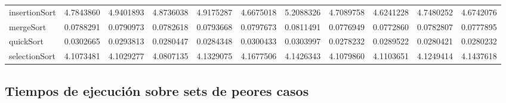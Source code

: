 \documentclass[article,a4paper]{article}
\begin{document}
\begin{table}[h]
{\begin{tabular}{lllllllllll}
insertionSort   & 4.7843860       & 4.9401893       & 4.8736038       & 4.9175287       & 4.6675018       & 5.2088326       & 4.7089758       & 4.6241228       & 4.7480252       & 4.6742076       \\
mergeSort       & 0.0788291       & 0.0790973       & 0.0782618       & 0.0793668       & 0.0797673       & 0.0811491       & 0.0776949       & 0.0772860       & 0.0782807       & 0.0777895       \\
quickSort       & 0.0302665       & 0.0293813       & 0.0280447       & 0.0284348       & 0.0300433       & 0.0303997       & 0.0278232       & 0.0289522       & 0.0280421       & 0.0280232       \\
selectionSort   & 4.1073481       & 4.1029277       & 4.0807135       & 4.1329075       & 4.1677506       & 4.1426343       & 4.1079860       & 4.1103651       & 4.1249414       & 4.1437618      
\end{tabular}}
\end{table}

\subsection{Tiempos de ejecución sobre sets de peores casos}
\end{document}
